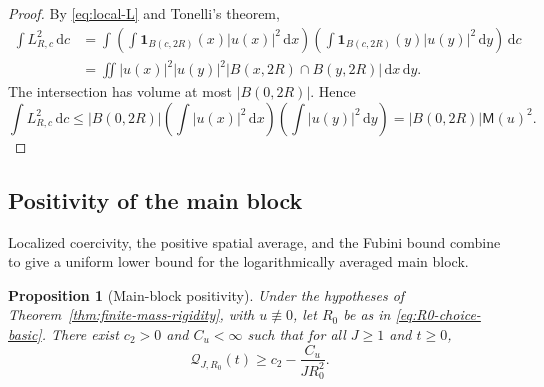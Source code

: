 \documentclass{interact}
\numberwithin{equation}{section}
\theoremstyle{plain}
\newtheorem{proposition}[theorem]{Proposition}
\theoremstyle{definition}
\theoremstyle{remark}
\newcommand{\M}{\mathsf M}
\newcommand{\dd}{\,\mathrm d}
\newcommand{\one}{\mathbf 1}
\begin{document}
\begin{proof}
By \eqref{eq:local-L} and Tonelli's theorem,
\begin{align*}
 \int L_{R,c}^2\dd c
 &=\int\left(\int\one_{B(c,2R)}(x)|u(x)|^2\dd x\right)
 \left(\int\one_{B(c,2R)}(y)|u(y)|^2\dd y\right)\dd c\\
 &=\iint |u(x)|^2|u(y)|^2
 |B(x,2R)\cap B(y,2R)|\dd x\dd y.
\end{align*}
The intersection has volume at most $|B(0,2R)|$. Hence
\[
 \int L_{R,c}^2\dd c
 \le |B(0,2R)|
 \left(\int|u(x)|^2\dd x\right)
 \left(\int|u(y)|^2\dd y\right)
 =|B(0,2R)|\M(u)^2.
\]
\end{proof}

\subsection{Positivity of the main block}

Localized coercivity, the positive spatial average, and the Fubini bound combine to give a uniform lower bound for the logarithmically averaged main block.

\begin{proposition}[Main-block positivity]\label{prop:Q-positive}
Under the hypotheses of Theorem~\ref{thm:finite-mass-rigidity}, with $u\not\equiv0$, let $R_0$ be as in \eqref{eq:R0-choice-basic}. There exist $c_2>0$ and $C_u<\infty$ such that for all $J\ge1$ and $t\ge0$,
\begin{equation}\label{eq:Q-positive-final}
 \mathcal Q_{J,R_0}(t)
 \ge c_2-\frac{C_u}{JR_0^2}.
\end{equation}
\end{proposition}
\end{document}
